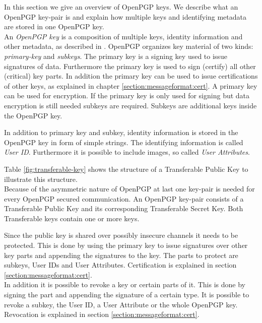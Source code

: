 In this section we give an overview of OpenPGP keys. We describe what an OpenPGP key-pair is and explain how multiple keys and identifying metadata are stored in one OpenPGP key. \\

An \textit{OpenPGP key} is a composition of multiple keys, identity information and other metadata, as described in  \cite[section 11.1]{RFC4880}. OpenPGP organizes key material of two kinds: \textit{primary-key} and \textit{subkeys}. The primary key is a signing key used to issue signatures of data. Furthermore the primary key is used to sign (certify) all other (critical) key parts. In addition the primary key can be used to issue certifications of other keys, as explained in chapter \ref{section:messageformat:cert}. A primary key can be used for encryption. If the primary key is only used for  signing but data encryption is still needed subkeys are required. Subkeys are additional keys inside the OpenPGP key. 

In addition to primary key and subkey, identity information is stored in the OpenPGP key in form of simple strings. The identifying information is called \textit{User ID}. Furthermore it is possible to include images, so called \textit{User Attributes}. 

Table \ref{fig:transferable-key} shows the structure of a Transferable Public Key to illustrate this structure. \\

Because of the  asymmetric nature of OpenPGP at last one key-pair is needed for every OpenPGP secured communication. An OpenPGP key-pair consists of a Transferable Public Key and its corresponding Transferable Secret Key. Both Transferable keys contain one or more keys. 


Since the public key is shared over possibly insecure channels it needs to be protected. This is done by using the primary key to issue signatures over other key parts and appending the signatures to the key. The parts to protect are subkeys, User IDs and User Attributes. Certification is explained in section \ref{section:messageformat:cert}. \\


In addition it is possible to revoke a key or certain parts of it. This is done by signing the part and appending the signature of a certain type. It is possible to revoke a subkey, the User ID, a User Attribute or the whole OpenPGP key. Revocation is explained in section \ref{section:messageformat:cert}.

